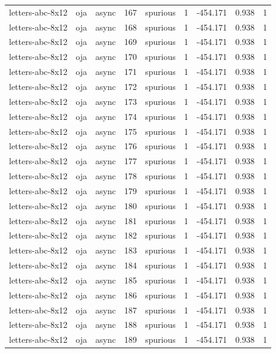 \begin{tabular}{lllrlrrrr}
letters-abc-8x12 & oja & async & 167 & spurious & 1 & -454.171 & 0.938 & 1 \\
letters-abc-8x12 & oja & async & 168 & spurious & 1 & -454.171 & 0.938 & 1 \\
letters-abc-8x12 & oja & async & 169 & spurious & 1 & -454.171 & 0.938 & 1 \\
letters-abc-8x12 & oja & async & 170 & spurious & 1 & -454.171 & 0.938 & 1 \\
letters-abc-8x12 & oja & async & 171 & spurious & 1 & -454.171 & 0.938 & 1 \\
letters-abc-8x12 & oja & async & 172 & spurious & 1 & -454.171 & 0.938 & 1 \\
letters-abc-8x12 & oja & async & 173 & spurious & 1 & -454.171 & 0.938 & 1 \\
letters-abc-8x12 & oja & async & 174 & spurious & 1 & -454.171 & 0.938 & 1 \\
letters-abc-8x12 & oja & async & 175 & spurious & 1 & -454.171 & 0.938 & 1 \\
letters-abc-8x12 & oja & async & 176 & spurious & 1 & -454.171 & 0.938 & 1 \\
letters-abc-8x12 & oja & async & 177 & spurious & 1 & -454.171 & 0.938 & 1 \\
letters-abc-8x12 & oja & async & 178 & spurious & 1 & -454.171 & 0.938 & 1 \\
letters-abc-8x12 & oja & async & 179 & spurious & 1 & -454.171 & 0.938 & 1 \\
letters-abc-8x12 & oja & async & 180 & spurious & 1 & -454.171 & 0.938 & 1 \\
letters-abc-8x12 & oja & async & 181 & spurious & 1 & -454.171 & 0.938 & 1 \\
letters-abc-8x12 & oja & async & 182 & spurious & 1 & -454.171 & 0.938 & 1 \\
letters-abc-8x12 & oja & async & 183 & spurious & 1 & -454.171 & 0.938 & 1 \\
letters-abc-8x12 & oja & async & 184 & spurious & 1 & -454.171 & 0.938 & 1 \\
letters-abc-8x12 & oja & async & 185 & spurious & 1 & -454.171 & 0.938 & 1 \\
letters-abc-8x12 & oja & async & 186 & spurious & 1 & -454.171 & 0.938 & 1 \\
letters-abc-8x12 & oja & async & 187 & spurious & 1 & -454.171 & 0.938 & 1 \\
letters-abc-8x12 & oja & async & 188 & spurious & 1 & -454.171 & 0.938 & 1 \\
letters-abc-8x12 & oja & async & 189 & spurious & 1 & -454.171 & 0.938 & 1 \\

\end{tabular}
